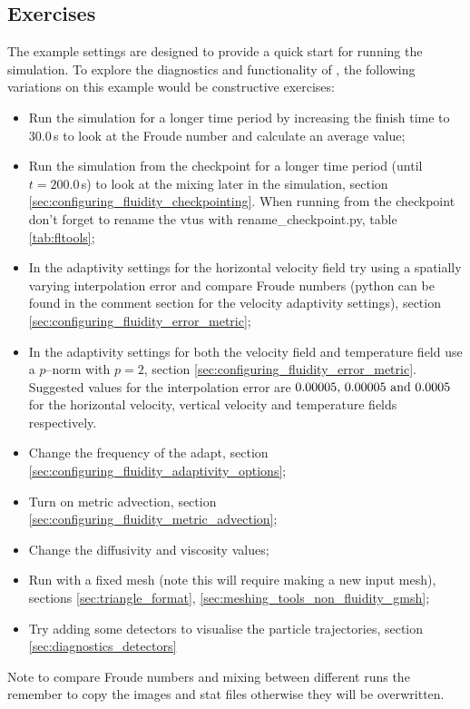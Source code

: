 \subsection{Exercises}
\label{sec:le_exercises}
The example settings are designed to provide a quick start for running the simulation. To explore the diagnostics and functionality of \fluidity, the following variations on this example would be constructive exercises:
\begin{itemize}
\item Run the simulation for a longer time period by increasing the finish time to $30.0\,$s to look at the Froude number and calculate an average value;
\item Run the simulation from the checkpoint for a longer time period (until $t=200.0\,$s) to look at the mixing later in the simulation, section \ref{sec:configuring_fluidity_checkpointing}. When running from the checkpoint don't forget to rename the vtus with rename\_checkpoint.py, table \ref{tab:fltools};
\item In the adaptivity settings for the horizontal velocity field try using a spatially varying interpolation error and compare Froude numbers (python can be found in the comment section for the velocity adaptivity settings), section \ref{sec:configuring_fluidity_error_metric};
\item In the adaptivity settings for both the velocity field and temperature field use a $p$--norm with \mbox{$p=2$}, section \ref{sec:configuring_fluidity_error_metric}. Suggested values for the interpolation error are $0.00005, \, 0.00005 \,\, {\rm and} \,\, 0.0005$ for the horizontal velocity, vertical velocity and temperature fields respectively. 
\item Change the frequency of the adapt, section \ref{sec:configuring_fluidity_adaptivity_options};
\item Turn on metric advection, section \ref{sec:configuring_fluidity_metric_advection};
\item Change the diffusivity and viscosity values;
\item Run with a fixed mesh (note this will require making a new input mesh), sections \ref{sec:triangle_format}, \ref{sec:meshing_tools_non_fluidity_gmsh};
\item Try adding some detectors to visualise the particle trajectories, section \ref{sec:diagnostics_detectors} %
\end{itemize}
Note to compare Froude numbers and mixing between different runs the remember to copy the images and stat files otherwise they will be overwritten.
 
